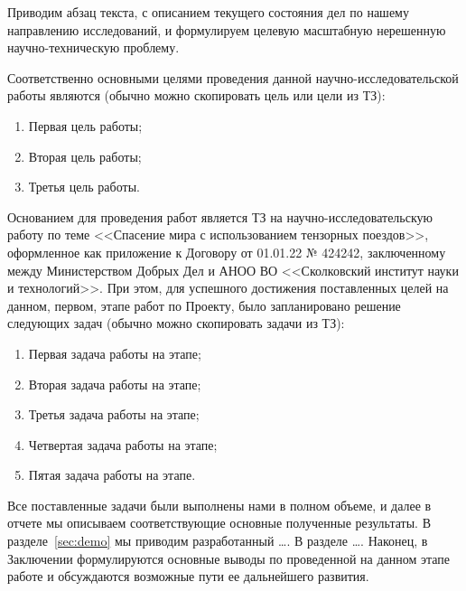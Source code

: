 Приводим абзац текста, с описанием текущего состояния дел по нашему направлению исследований, и формулируем целевую масштабную нерешенную научно-техническую проблему.

Соответственно основными целями проведения данной научно-исследовательской работы являются (обычно можно скопировать цель или цели из ТЗ):
\begin{enumerate}
	\item Первая цель работы;
	\item Вторая цель работы;
	\item Третья цель работы.
\end{enumerate}

Основанием для проведения работ является ТЗ на научно-исследовательскую работу по теме <<Спасение мира с использованием тензорных поездов>>, оформленное как приложение к Договору от 01.01.22 № 424242, заключенному между Министерством Добрых Дел и АНОО ВО <<Сколковский институт науки и технологий>>.
При этом, для успешного достижения поставленных целей на данном, первом, этапе работ по Проекту, было запланировано решение следующих задач (обычно можно скопировать задачи из ТЗ):
\begin{enumerate}
	\item Первая задача работы на этапе;
	\item Вторая задача работы на этапе;
	\item Третья задача работы на этапе;
	\item Четвертая задача работы на этапе;
	\item Пятая задача работы на этапе.
\end{enumerate}

Все поставленные задачи были выполнены нами в полном объеме, и далее в отчете мы описываем соответствующие основные полученные результаты.
В разделе~\ref{sec:demo} мы приводим разработанный \ldots.
В разделе \ldots.
Наконец, в Заключении формулируются основные выводы по проведенной на данном этапе работе и обсуждаются возможные пути ее дальнейшего развития.
